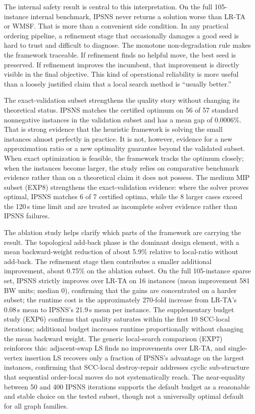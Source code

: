 

The internal safety result is central to this interpretation. On the full 105-instance internal benchmark, IPSNS never returns a solution worse than LR-TA or WMSF. That is more than a convenient side condition. In any practical ordering pipeline, a refinement stage that occasionally damages a good seed is hard to trust and difficult to diagnose. The monotone non-degradation rule makes the framework traceable. If refinement finds no helpful move, the best seed is preserved. If refinement improves the incumbent, that improvement is directly visible in the final objective. This kind of operational reliability is more useful than a loosely justified claim that a local search method is ``usually better.''

The exact-validation subset strengthens the quality story without changing its theoretical status. IPSNS matches the certified optimum on 56 of 57 standard nonnegative instances in the validation subset and has a mean gap of 0.0006\%. That is strong evidence that the heuristic framework is solving the small instances almost perfectly in practice. It is not, however, evidence for a new approximation ratio or a new optimality guarantee beyond the validated subset. When exact optimization is feasible, the framework tracks the optimum closely; when the instances become larger, the study relies on comparative benchmark evidence rather than on a theoretical claim it does not possess.
The medium MIP subset (EXP8) strengthens the exact-validation evidence: where the solver proves optimal, IPSNS matches 6 of 7 certified optima, while the 8 larger cases exceed the 120\,s time limit and are treated as incomplete solver evidence rather than IPSNS failures.

The ablation study helps clarify which parts of the framework are carrying the result. The topological add-back phase is the dominant design element, with a mean backward-weight reduction of about 5.9\% relative to local-ratio without add-back. The refinement stage then contributes a smaller additional improvement, about 0.75\% on the ablation subset. On the full 105-instance sparse set, IPSNS strictly improves over LR-TA on 16 instances (mean improvement 581 BW units; median 0), confirming that the gains are concentrated on a harder subset; the runtime cost is the approximately 270-fold increase from LR-TA's 0.08\,s mean to IPSNS's 21.9\,s mean per instance. The supplementary budget study (EXP6) confirms that quality saturates within the first 10 SCC-local iterations; additional budget increases runtime proportionally without changing the mean backward weight. The generic local-search comparison (EXP7) reinforces this: adjacent-swap LS finds no improvements over LR-TA, and single-vertex insertion LS recovers only a fraction of IPSNS's advantage on the largest instances, confirming that SCC-local destroy-repair addresses cyclic sub-structure that sequential order-local moves do not systematically reach. The near-equality between 50 and 400 IPSNS iterations supports the default budget as a reasonable and stable choice on the tested subset, though not a universally optimal default for all graph families.

